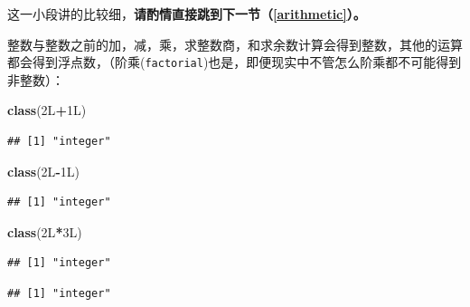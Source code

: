 \documentclass[]{book}
\newenvironment{Shaded}{\begin{snugshade}}{\end{snugshade}}
\newcommand{\KeywordTok}[1]{\textcolor[rgb]{0.13,0.29,0.53}{\textbf{#1}}}
\newcommand{\NormalTok}[1]{#1}
\newcommand{\OperatorTok}[1]{\textcolor[rgb]{0.81,0.36,0.00}{\textbf{#1}}}
\begin{document}
这一小段讲的比较细，\textbf{请酌情直接跳到下一节（\ref{arithmetic}）。}

整数与整数之前的加，减，乘，求整数商，和求余数计算会得到整数，其他的运算都会得到浮点数，（阶乘(\texttt{factorial})也是，即便现实中不管怎么阶乘都不可能得到非整数）：

\begin{Shaded}
\begin{Highlighting}[]
\KeywordTok{class}\NormalTok{(2L}\OperatorTok{+}\NormalTok{1L)}
\end{Highlighting}
\end{Shaded}

\begin{verbatim}
## [1] "integer"
\end{verbatim}

\begin{Shaded}
\begin{Highlighting}[]
\KeywordTok{class}\NormalTok{(2L}\OperatorTok{-}\NormalTok{1L)}
\end{Highlighting}
\end{Shaded}

\begin{verbatim}
## [1] "integer"
\end{verbatim}

\begin{Shaded}
\begin{Highlighting}[]
\KeywordTok{class}\NormalTok{(2L}\OperatorTok{*}\NormalTok{3L)}
\end{Highlighting}
\end{Shaded}

\begin{verbatim}
## [1] "integer"
\end{verbatim}

\begin{Shaded}
\end{Shaded}

\begin{verbatim}
## [1] "integer"
\end{verbatim}

\begin{Shaded}
\end{Shaded}
\end{document}
